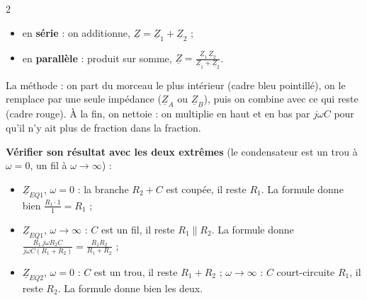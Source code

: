 \documentclass[a4paper,9pt]{extarticle}
\begin{document}
\begin{multicols}{2}
\begin{important}
\begin{itemize}
\item en \textbf{série} : on additionne, $\underline{Z} = \underline{Z}_1 + \underline{Z}_2$ ;

\item en \textbf{parallèle} : produit sur somme, $\underline{Z} = \frac{\underline{Z}_1\,\underline{Z}_2}{\underline{Z}_1 + \underline{Z}_2}$.

\end{itemize}

La méthode : on part du morceau le plus \og intérieur \fg{} (cadre bleu pointillé), on le remplace par une seule impédance ($\underline{Z}_A$ ou $\underline{Z}_B$), puis on combine avec ce qui reste (cadre rouge). À la fin, on nettoie : on multiplie en haut et en bas par $j\omega C$ pour qu'il n'y ait plus de fraction dans la fraction.

\vspace{3pt}

\textbf{Vérifier son résultat avec les deux extrêmes} (le condensateur est un trou à $\omega = 0$, un fil à $\omega \to \infty$) :

\begin{itemize}

\item $\underline{Z}_{EQ1}$, $\omega = 0$ : la branche $R_2 + C$ est coupée, il reste $R_1$. La formule donne bien $\frac{R_1 \cdot 1}{1} = R_1$ ;

\item $\underline{Z}_{EQ1}$, $\omega \to \infty$ : $C$ est un fil, il reste $R_1 \parallel R_2$. La formule donne $\frac{R_1\,j\omega R_2 C}{j\omega C(R_1 + R_2)} = \frac{R_1 R_2}{R_1 + R_2}$ ;

\item $\underline{Z}_{EQ2}$, $\omega = 0$ : $C$ est un trou, il reste $R_1 + R_2$ ; $\omega \to \infty$ : $C$ court-circuite $R_1$, il reste $R_2$. La formule donne bien les deux.

\end{itemize}

\end{important}


\end{multicols}
\end{document}
